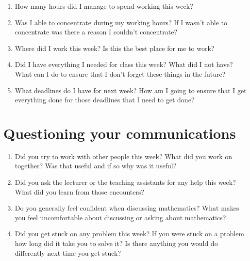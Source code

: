 \documentclass[a4paper]{article}
\begin{document}
\begin{enumerate}
\item How many hours did I manage to spend working this week?

\item Was I able to concentrate during my working hours?  If I wasn't able to concentrate was there a reason I couldn't concentrate?

\item Where did I work this week?  Is this the best place for me to work?

\item Did I have everything I needed for class this week?  What did I not have?  What can I do to ensure that I don't forget these things in the future?

\item What deadlines do I have for next week?  How am I going to ensure that I get everything done for those deadlines that I need to get done?

\end{enumerate}

\section*{Questioning your communications}

\begin{enumerate}

\item Did you try to work with other people this week?  What did you work on together?  Was that useful and if so why was it useful?

\item Did you ask the lecturer or the teaching assistants for any help this week?  What did you learn from those encounters?

\item Do you generally feel confident when discussing mathematics?  What makes you feel uncomfortable about discussing or asking about mathematics?

\item Did you get stuck on any problem this week?  If you were stuck on a problem how long did it take you to solve it?  Is there anything you would do differently next time you get stuck? 

\end{enumerate}
\end{document}
